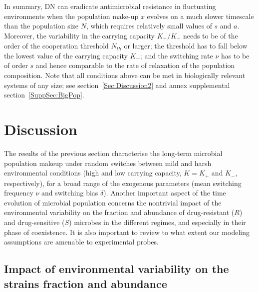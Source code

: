 \documentclass{article}
\begin{document}
In summary, DN can eradicate antimicrobial resistance in fluctuating environments when the population make-up \(x\) evolves on a much slower timescale than the population size \(N\), which requires relatively small values of \(s\) and \(a\). Moreover, the variability in the carrying capacity \(K_+/K_-\) needs to be of the order of the cooperation threshold \(N_{th}\) or larger; the threshold has to fall below the lowest value of the carrying capacity \(K_{-}\); and the switching rate \(\nu\) has to be of order \(s\) and hence comparable to the rate of relaxation of the population composition. Note that all conditions above can be met in biologically relevant systems of any size; see section~\ref{Sec:Discussion2} and annex supplemental section~\ref{SuppSec:BigPop}.

\section{Discussion}\label{Sec:Discussion}
The results of the previous section characterise the long-term microbial population makeup under random switches between mild and harsh environmental conditions (high and low carrying capacity, $K=K_+$ and $K_-$, respectively), for a broad range of the exogenous parameters (mean switching frequency \(\nu\) and switching bias \(\delta\)). Another important aspect of the time evolution of microbial population concerns the nontrivial impact of the environmental variability on the fraction and abundance of drug-resistant ($R$) and drug-sensitive ($S$) microbes in the different regimes, and especially in their phase of coexistence. It is also important to review to what extent our modeling assumptions are amenable to experimental probes. 

\subsection{Impact of environmental variability on the strains fraction and abundance}\label{Sec:Discussion1}
\end{document}
